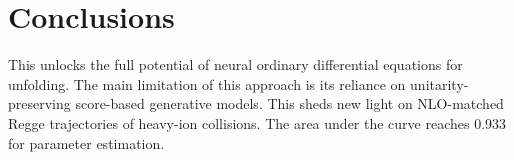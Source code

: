 \section{Conclusions}\label{sec:conclusions}

This unlocks the full potential of neural ordinary differential
equations for unfolding. The main limitation of this approach is its
reliance on unitarity-preserving score-based generative models. This
sheds new light on NLO-matched Regge trajectories of heavy-ion
collisions. The area under the curve reaches 0.933 for parameter
estimation.

